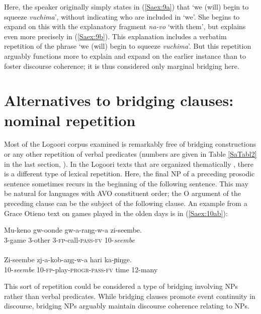 \documentclass[output=paper]{LSP/langsci}
\begin{document}
Here, the speaker originally simply states in (\ref{Saex:9a}) that `we (will) begin to squeeze \textit{vuchima}', without indicating who are included in `we'. She begins to expand on this with the explanatory fragment \textit{na-vo} `with them', but explains even more precisely in (\ref{Saex:9b}). This explanation includes a verbatim repetition of the phrase `we (will) begin to squeeze \textit{vuchima}'. But this repetition arguably functions more to explain and expand on the earlier instance than to foster discourse coherence; it is thus considered only marginal bridging here.


\section{Alternatives to bridging clauses: nominal repetition}
\label{Saalternatives}
Most of the Logoori corpus examined is remarkably free of bridging constructions or any other repetition of verbal predicates (numbers are given in Table \ref{SaTabl2} in the last section, ). In the Logoori texts that are organized thematically \citep{farr99}, there is a different type of lexical repetition. Here, the final NP of a preceding prosodic sentence sometimes recurs in the beginning of the following sentence. This may be natural for languages with AVO constituent order; the O argument of the preceding clause can be the subject of the following clause. An example from a Grace Otieno text on games played in the olden days is in (\ref{Saex:10ab}):


\begin{exe}
\ex \label{Saex:10ab}
\begin{xlist}
\ex \label{Saex:10a}
\gll Mu-keno  gw-oonde  gw-a-raŋg-w-a    zi-seembe. \\
3-game    3-other    3-\textsc{fp}-call-\textsc{pass}-\textsc{fv}  10-\textit{seembe}\\
\glt {}\\
\ex \label{Saex:10b}
\gll Zi-seembe  zj-a-kob-aŋg-w-a    hari  ka-ɲiŋge.\\     	       
   10-\textit{seembe}  10-\textsc{fp}-play-\textsc{progr}-\textsc{pass}-\textsc{fv}  time  12-many\\
\glt {} 
\end{xlist}
\end{exe}


This sort of repetition could be considered a type of bridging involving NPs rather than verbal predicates. While bridging clauses promote event continuity in discourse, bridging NPs arguably maintain discourse coherence relating to NPs. 
\end{document}
